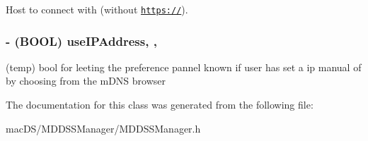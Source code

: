 Host to connect with (without \href{https://}{\tt https\-://}). \hypertarget{interface_m_d_d_s_s_manager_a4851a2746d573ed0bceddef07fd520f7}{
\subsubsection[{use\-I\-P\-Address}]{\setlength{\rightskip}{0pt plus 5cm}-\/ (B\-O\-O\-L) use\-I\-P\-Address\hspace{0.3cm}{\ttfamily [read]}, {\ttfamily [write]}, {\ttfamily [atomic]}}}\label{interface_m_d_d_s_s_manager_a4851a2746d573ed0bceddef07fd520f7}
(temp) bool for leeting the preference pannel known if user has set a ip manual of by choosing from the m\-D\-N\-S browser 

The documentation for this class was generated from the following file\-:\begin{DoxyCompactItemize}
\item 
mac\-D\-S/\-M\-D\-D\-S\-S\-Manager/M\-D\-D\-S\-S\-Manager.\-h\end{DoxyCompactItemize}
